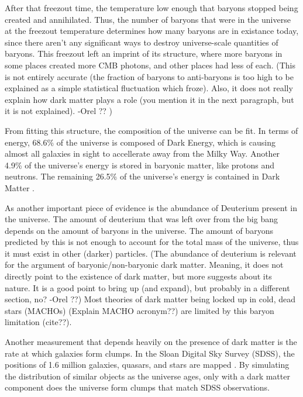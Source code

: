     After that freezout time, the temperature low enough that baryons stopped being created and annihilated.
    Thus, the number of baryons that were in the universe at the freezout temperature determines how many baryons are in existance today, since there aren't any significant ways to destroy universe-scale quantities of baryons.
    This freezout left an imprint of its structure, where more baryons in some places created more CMB photons, and other places had less of each.
    {\color{red}(This is not entirely accurate (the fraction of baryons to anti-baryons is too high to be explained as a simple statistical fluctuation which froze).
Also, it does not really explain how dark matter plays a role (you mention it in the next paragraph, but it is not explained). -Orel ?? )}

    From fitting this structure, the composition of the universe can be fit.
    In terms of energy, 68.6\% of the universe is composed of Dark Energy, which is causing almost all galaxies in sight to accellerate away from the Milky Way.
    Another 4.9\% of the universe's energy is stored in baryonic matter, like protons and neutrons.
    The remaining 26.5\% of the universe's energy is contained in Dark Matter \cite{planck2015}.

    As another important piece of evidence is the abundance of Deuterium present in the universe.
    The amount of deuterium that was left over from the big bang depends on the amount of baryons in the universe.
    The amount of baryons predicted by this is not enough to account for the total mass of the universe, thus it must exist in other (darker) particles.
    {\color{red}(The abundance of deuterium is relevant for the argument of baryonic/non-baryonic dark matter. Meaning, it does not directly point to the existence of dark matter, but more suggests about its nature. It is a good point to bring up (and expand), but probably in a different section, no? -Orel ??)}
    Most theories of dark matter being locked up in cold, dead stars (MACHOs) {\color{red}(Explain MACHO acronym??)} are limited by this baryon limitation {\color{red}(cite??)}.

    Another measurement that depends heavily on the presence of dark matter is the rate at which galaxies form clumps.
    In the Sloan Digital Sky Survey (SDSS), the positions of 1.6 million galaxies, quasars, and stars are mapped \cite{sdss_release}.
    By simulating the distribution of similar objects as the universe ages, only with a dark matter component does the universe form clumps that match SDSS observations.
  
